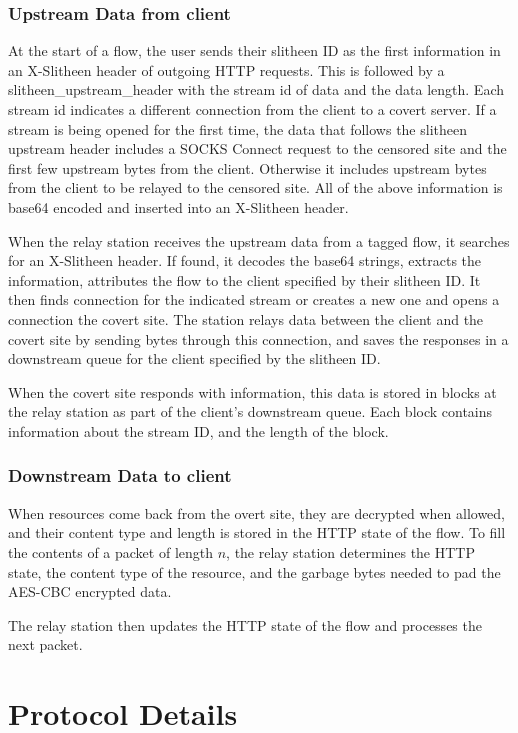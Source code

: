 \documentclass[11pt]{article}
\theoremstyle{definittion}
\begin{document}
\subsubsection{Upstream Data from client}

At the start of a flow, the user sends their slitheen ID as the first information in an X-Slitheen header of outgoing HTTP requests. This is followed by a slitheen\_upstream\_header with the stream id of data and the data length. Each stream id indicates a different connection from the client to a covert server.
If a stream is being opened for the first time, the data that follows the slitheen upstream header includes a SOCKS Connect request to the censored site and the first few upstream bytes from the client. Otherwise it includes upstream bytes from the client to be relayed to the censored site. All of the above information is base64 encoded and inserted into an X-Slitheen header.

When the relay station receives the upstream data from a tagged flow, it searches for an X-Slitheen header. If found, it decodes the base64 strings, extracts the information, attributes the flow to the client specified by their slitheen ID.
It then finds connection for the indicated stream or creates a new one and opens a connection the covert site. The station relays data between the client and the covert site by sending bytes through this connection, and saves the responses in a downstream queue for the client specified by the slitheen ID.

When the covert site responds with information, this data is stored in blocks at the relay station as part of the client's downstream queue. Each block contains information about the stream ID, and the length of the block.

\subsubsection{Downstream Data to client}

When resources come back from the overt site, they are decrypted when allowed, and their content type and length is stored in the HTTP state of the flow. To fill the contents of a packet of length $n$, the relay station determines the HTTP state, the content type of the resource, and the garbage bytes needed to pad the AES-CBC encrypted data.

The relay station then updates the HTTP state of the flow and processes the next packet.

\section{Protocol Details}
\end{document}
